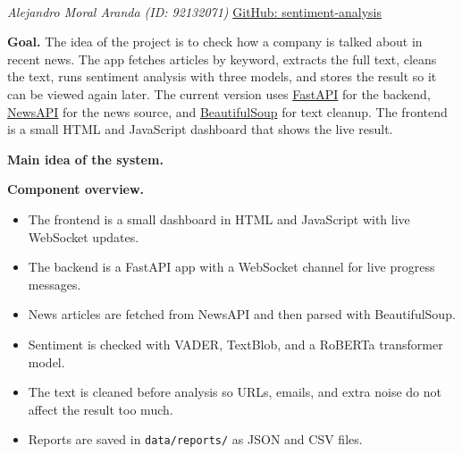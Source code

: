 \documentclass[11pt,a4paper]{article}
\begin{document}
\\[-1mm]
\noindent\textit{Alejandro Moral Aranda (ID: 92132071)}
\noindent\small\href{https://github.com/alejandromoralwork/sentiment-analysis}{GitHub: sentiment-analysis}
\vspace{2mm}

\textbf{Goal.}
The idea of the project is to check how a company is talked about in recent news. The app fetches articles by keyword, extracts the full text, cleans the text, runs sentiment analysis with three models, and stores the result so it can be viewed again later. The current version uses \href{https://fastapi.tiangolo.com/}{FastAPI} for the backend, \href{https://newsapi.org/}{NewsAPI} for the news source, and \href{https://www.crummy.com/software/BeautifulSoup/bs4/doc/}{BeautifulSoup} for text cleanup. The frontend is a small HTML and JavaScript dashboard that shows the live result.

\textbf{Main idea of the system.}
\begin{center}
\end{center}

\textbf{Component overview.}
\begin{itemize}
    \item The frontend is a small dashboard in HTML and JavaScript with live WebSocket updates.
    \item The backend is a FastAPI app with a WebSocket channel for live progress messages.
    \item News articles are fetched from NewsAPI and then parsed with BeautifulSoup.
    \item Sentiment is checked with VADER, TextBlob, and a RoBERTa transformer model.
    \item The text is cleaned before analysis so URLs, emails, and extra noise do not affect the result too much.
    \item Reports are saved in \texttt{data/reports/} as JSON and CSV files.
\end{itemize}
\end{document}
